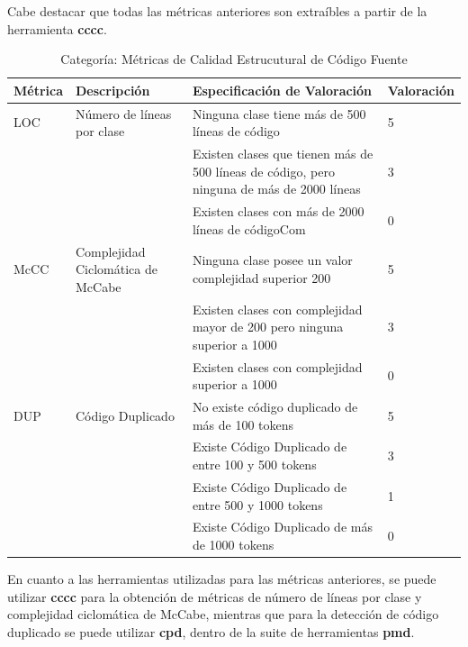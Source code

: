 \documentclass[11pt]{article}
\begin{document}
Cabe destacar que todas las métricas anteriores son extraíbles a partir de la herramienta \textbf{cccc}.

\begin{table}[H]
  \begin{center}
    \begin{tabular}{ | p{1.6cm} | p{3cm} | p{8cm} | p{2cm} | }
    \toprule
    \textbf{Métrica} & \textbf{Descripción} & \textbf{Especificación de Valoración} & \textbf{Valoración} \\
    \hline
    LOC & Número de líneas por clase & Ninguna clase tiene más de 500 líneas de código & 5 \\ \cline{3-3} \cline{4-4} 
    & & Existen clases que tienen más de 500 líneas de código, pero ninguna de más de 2000 líneas & 3 \\ \cline{3-3}\cline{4-4}
    & & Existen clases con más de 2000 líneas de códigoCom & 0 \\ \cline{3-3}\cline{4-4}
    \hline
    McCC & Complejidad Ciclomática de McCabe & Ninguna clase posee un valor complejidad superior 200 & 5 \\ \cline{3-3} \cline{4-4} 
    & & Existen clases con complejidad mayor de 200 pero ninguna superior a 1000 & 3 \\ \cline{3-3}\cline{4-4}
    & & Existen clases con complejidad superior a 1000 & 0 \\ \cline{3-3}\cline{4-4}
    \hline
    DUP & Código Duplicado & No existe código duplicado de más de 100 tokens & 5 \\ \cline{3-3} \cline{4-4} 
    & & Existe Código Duplicado de entre 100 y 500 tokens & 3 \\ \cline{3-3}\cline{4-4}
    & & Existe Código Duplicado de entre 500 y 1000 tokens & 1 \\ \cline{3-3}\cline{4-4}
    & & Existe Código Duplicado de más de 1000 tokens & 0 \\ 
    \bottomrule
    \end{tabular}
    \caption{Categoría: Métricas de Calidad Estrucutural de Código Fuente}
    \label{tab:metrics_struct}
  \end{center}
\end{table}

En cuanto a las herramientas utilizadas para las métricas anteriores, se puede utilizar \textbf{cccc} para la obtención de métricas de número de líneas por clase y complejidad ciclomática de McCabe, mientras que para la detección de código duplicado se puede utilizar \textbf{cpd}, dentro de la suite de herramientas \textbf{pmd}.
\end{document}
